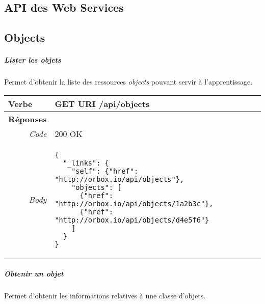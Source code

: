 \begin{appendices}
\chapter{API des Web Services}
\label{annexe_api}

\section{Objects}


\begin{absolutelynopagebreak}
\paragraph{Lister les objets}

Permet d'obtenir la liste des ressources \emph{objects} pouvant servir à l'apprentissage.

\begin{tabular}{@{}p{2cm}p{11.5cm}@{}}
    \toprule
    \textbf{Verbe}                        & GET \hspace{2.5cm} \textbf{URI} \hspace{0.25cm} /api/objects   \\ \midrule
    \midrule
    \textbf{Réponses}                     &        \\
    \multicolumn{1}{r}{\textit{Code}}   & 200 OK \\
    \multicolumn{1}{r}{\textit{Body}}   & \begin{verbatim}
{
  "_links": {
    "self": {"href": "http://orbox.io/api/objects"},
    "objects": [
      {"href": "http://orbox.io/api/objects/1a2b3c"},
      {"href": "http://orbox.io/api/objects/d4e5f6"}
    ]
  }
}
    \end{verbatim}
    \\ \bottomrule
\end{tabular}
\end{absolutelynopagebreak}
 
\begin{absolutelynopagebreak}
\paragraph{Obtenir un objet}

Permet d'obtenir les informations relatives à une classe d'objets.


\end{absolutelynopagebreak}
\end{appendices}
